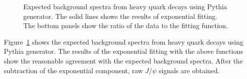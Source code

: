{\begin{description}
\begin{figure}[!h]
\begin{center}
   \end{center}	
   \caption{ Expected background spectra from heavy quark decays using Pythia generator. The solid lines shows the results of exponential fitting. The bottom panels show the ratio of the data to the fitting function. }
  \label{fig_4_pythiahf}
    \end{figure}
    Figure~\ref{fig_4_pythiahf}  shows the expected background spectra from heavy quark decays using Pythia generator. 
  The results of the exponential fitting with the above functions show the reasonable agreement with the expected background spectra. 	  
  After the subtraction of the exponential component, raw $J/\psi$ signals are obtained. 
\end{description}


}

